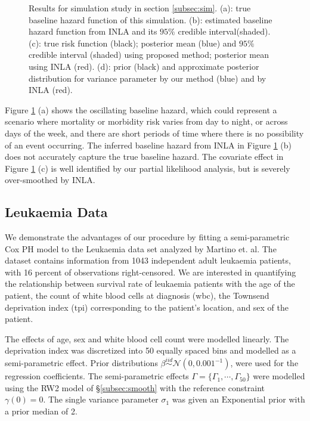\documentclass[serif,10pt]{wiley-article}
\begin{document}
\begin{figure}[ht]
{}
\caption{Results for simulation study in section \ref{subsec:sim}. (a): true baseline hazard function of this simulation. (b): estimated baseline hazard function from INLA and its $95\%$ credible interval(shaded). (c): true risk function (black); posterior mean (blue) and $95\%$ credible interval (shaded) using proposed method; posterior mean using INLA (red). (d): prior (black) and approximate posterior distribution for variance parameter by our method (blue) and by INLA (red).}
\label{fig:simulation}
\end{figure}

Figure \ref{fig:simulation} (a) shows the oscillating baseline hazard, which could represent a scenario where mortality or morbidity risk varies from day to night, or across days of the week, and there are short periods of time where there is no possibility of an event occurring. The inferred baseline hazard from INLA in  Figure \ref{fig:simulation} (b) does not accurately capture the true baseline hazard. The covariate effect in Figure \ref{fig:simulation} (c) is well identified by our partial likelihood analysis, but is severely over-smoothed by INLA.


\subsection{Leukaemia Data}\label{subsec:leuk}

We demonstrate the advantages of our procedure by fitting a semi-parametric Cox PH model to the Leukaemia data set analyzed by Martino et. al. \cite{inlacoxph} The dataset contains information from 1043 independent adult leukaemia patients, with 16 percent of observations right-censored. We are interested in quantifying the relationship between survival rate of leukaemia patients with the age of the patient, the count of white blood cells at diagnosis (wbc), the Townsend deprivation index (tpi) corresponding to the patient's location, and sex of the patient.

The effects of age, sex and white blood cell count were modelled linearly. The deprivation index was discretized into 50 equally spaced bins and modelled as a semi-parametric effect. Prior distributions $\beta \stackrel{iid}{\sim} \mathcal{N}(0, 0.001^{-1})$, were used for the regression coefficients. The semi-parametric effects $\Gamma = \{\Gamma_{1}, \cdots, \Gamma_{50}\}$ were modelled using the RW2 model of \S\ref{subsec:smooth} with the reference constraint $\gamma(0) = 0$. The single variance parameter $\sigma_{1}$ was given an $\text{Exponential}$ prior with a prior median of 2. 
\end{document}
